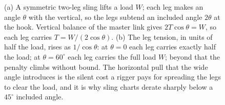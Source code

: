\begin{figure}[htbp]
\caption[A two-leg sling and the tension penalty of a wide angle]{(a) A
symmetric two-leg sling lifts a load $W$; each leg makes an angle $\theta$
with the vertical, so the legs subtend an included angle $2\theta$ at the
hook. Vertical balance of the master link gives $2T\cos\theta = W$, so each
leg carries $T = W/(2\cos\theta)$. (b) The leg tension, in units of half
the load, rises as $1/\cos\theta$: at $\theta = 0$ each leg carries exactly
half the load; at $\theta = 60^{\circ}$ each leg carries the full load $W$;
beyond that the penalty climbs without bound. The horizontal pull that the
wide angle introduces is the silent cost a rigger pays for spreading the
legs to clear the load, and it is why sling charts derate sharply below a
$45^{\circ}$ included angle.}
\label{fig:vol03ch01:sling-plan}
\end{figure}
